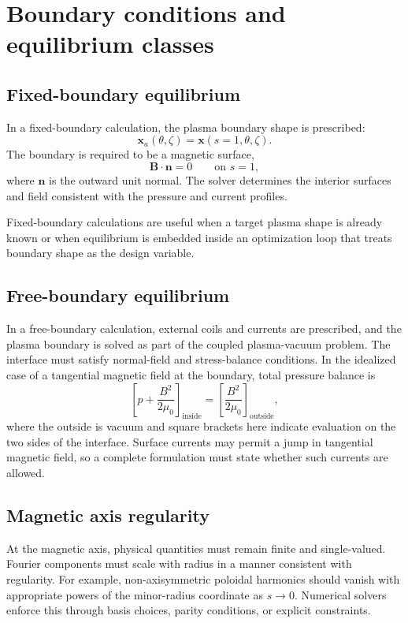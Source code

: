\section{Boundary conditions and equilibrium classes}
\label{sec:boundary_conditions}

\subsection{Fixed-boundary equilibrium}
In a fixed-boundary calculation, the plasma boundary shape is prescribed:
\begin{equation}
\mathbf x_a(\theta,\zeta)=\mathbf x(s=1,\theta,\zeta).
\end{equation}
The boundary is required to be a magnetic surface,
\begin{equation}
\mathbf B\cdot\mathbf n=0
\qquad\text{on }s=1,
\label{eq:fixed_boundary_Bn}
\end{equation}
where $\mathbf n$ is the outward unit normal. The solver determines the interior surfaces and field consistent with the pressure and current profiles.

Fixed-boundary calculations are useful when a target plasma shape is already known or when equilibrium is embedded inside an optimization loop that treats boundary shape as the design variable.

\subsection{Free-boundary equilibrium}
In a free-boundary calculation, external coils and currents are prescribed, and the plasma boundary is solved as part of the coupled plasma-vacuum problem. The interface must satisfy normal-field and stress-balance conditions. In the idealized case of a tangential magnetic field at the boundary, total pressure balance is
\begin{equation}
\left[
 p+\frac{B^2}{2\mu_0}
\right]_{\mathrm{inside}}
=
\left[
\frac{B^2}{2\mu_0}
\right]_{\mathrm{outside}},
\label{eq:total_pressure_boundary}
\end{equation}
where the outside is vacuum and square brackets here indicate evaluation on the two sides of the interface. Surface currents may permit a jump in tangential magnetic field, so a complete formulation must state whether such currents are allowed.

\subsection{Magnetic axis regularity}
At the magnetic axis, physical quantities must remain finite and single-valued. Fourier components must scale with radius in a manner consistent with regularity. For example, non-axisymmetric poloidal harmonics should vanish with appropriate powers of the minor-radius coordinate as $s\rightarrow0$. Numerical solvers enforce this through basis choices, parity conditions, or explicit constraints.

